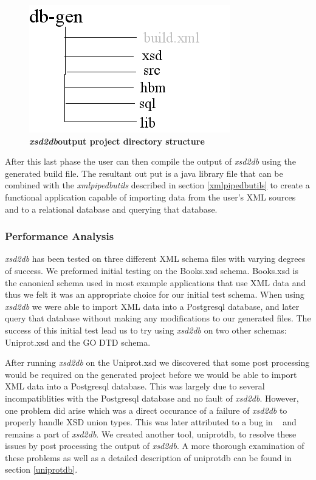 \begin{figure}[htbp]
\begin{center}
\includegraphics[scale=0.8]{./Images/xsd2dbStructure.jpg}
\caption{{\bf \emph{xsd2db}output project directory structure}}
\label{xsd2dbStructure}
\end{center}
\end{figure}

After this last phase the user can then compile the output of \emph{xsd2db} using the generated build file.  The resultant out put is a java library file that can be combined with the \emph{xmlpipedbutils} described in section \ref{xmlpipedbutils} to create a functional application capable of importing data from the user's XML sources and to a relational database and querying that database.

\subsubsection{Performance Analysis}
\emph{xsd2db} has been tested on three different XML schema files with varying degrees of success.  We preformed initial testing on the Books.xsd schema.  Books.xsd is the canonical schema used in most example applications that use XML data and thus we felt it was an appropriate choice for our initial test schema.  When using \emph{xsd2db} we were able to import XML data into a Postgresql database, and later query that database without making any modifications to our generated files.  The success of this initial test lead us to try using \emph{xsd2db} on two other schemas: Uniprot.xsd and the GO DTD schema.  

After running \emph{xsd2db} on the Uniprot.xsd we discovered that some post processing would be required on the generated project before we would be able to import XML data into a Postgresql database.  This was largely due to several incompatiblities with the Postgresql database and no fault of \emph{xsd2db}.  However, one problem did arise which was a direct occurance of a failure of \emph{xsd2db} to properly handle XSD union types.  This was later attributed to a bug in ~  and remains a part of \emph{xsd2db}.  We created another tool, uniprotdb, to resolve these issues by post processing the output of \emph{xsd2db}.  A more thorough examination of these problems as well as a detailed description of uniprotdb can be found in section \ref{uniprotdb}.

